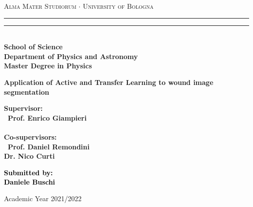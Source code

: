 \documentclass[../main.tex]{subfiles}
\begin{document}
\begin{titlepage}
%
%
%
%
\begin{center}
{{\Large{\textsc{Alma Mater Studiorum $\cdot$ University of  Bologna}}}} 
\rule[0.1cm]{15.8cm}{0.1mm}
\rule[0.5cm]{15.8cm}{0.6mm}
\\\vspace{3mm}
{\small{\bf School of Science \\
Department of Physics and Astronomy\\
Master Degree in Physics}}
\end{center}

\vspace{23mm}

\begin{center}
%
%
{\LARGE{\bf Application of Active and Transfer Learning to wound image segmentation
}}\\
\end{center}

\vspace{45mm} \par \noindent

\begin{minipage}[t]{0.47\textwidth}
%
%
{\large{\bf Supervisor: \vspace{2mm}\\\
Prof. Enrico Giampieri\\\\
%
%
\bf Co-supervisors: 
\vspace{2mm}\\\
Prof. Daniel Remondini\\
Dr. Nico Curti}}
\end{minipage}
%
\hfill
%
\begin{minipage}[t]{0.47\textwidth}\raggedleft \textcolor{black}{
{\large{\bf Submitted by:
\vspace{2mm}\\
Daniele Buschi}}}
\end{minipage}

\vspace{30mm}

\begin{center}
%
%
Academic Year 2021/2022
\end{center}

\end{titlepage}
\end{document}
